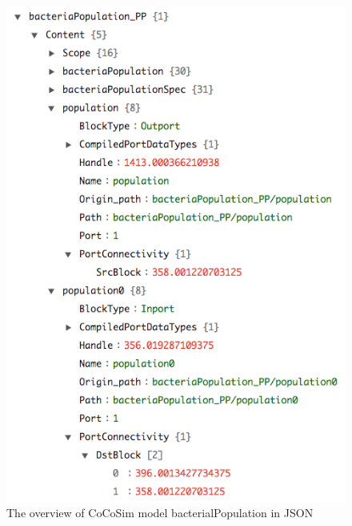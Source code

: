 \documentclass{article}
\begin{document}
\begin{figure}[h]
\begin{center}
  \includegraphics[scale=0.35]{figures/jsoncontract}    
\end{center}  
  \caption{The overview of CoCoSim model bacterialPopulation in JSON}
  \label{jsoncontract}
\end{figure}
\end{document}
